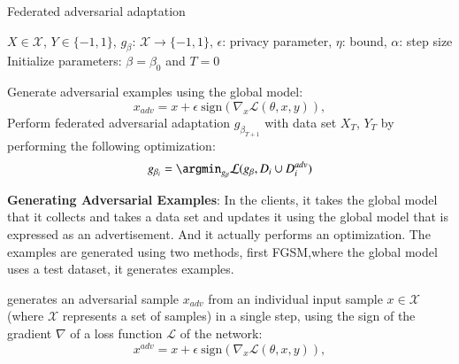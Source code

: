 \begin{algorithm}[h]
\caption{Federated adversarial adaptation}
\label{algo1}
$X \in \mathcal{X}$, $Y \in \{-1, 1\}$, $g_{\beta}$: $\mathcal{X} \to \{-1, 1\}$, $\epsilon$: privacy parameter, $\eta$: bound, $\alpha$: step size
\STATE Initialize parameters: $\beta = \beta_0$ and $T = 0$\\
 
    
    Generate adversarial examples using the global model:
    \begin{equation*}
    x_{adv} = x + \epsilon\ \mbox{sign}(\nabla_x\mathcal{L}(\theta,x,y)),
    \end{equation*}
    Perform federated adversarial adaptation $g_{\beta_{T+1}}$ with data set $X_T$, $Y_T$ by performing the following optimization: 
    \begin{equation*}
            g_{\beta_i} = \argmin_{g_{\beta}} \mathcal{L}(g_{\beta}, D_i \cup D_i^{adv}) 
        \end{equation*}
\end{algorithm}


\textbf{Generating Adversarial Examples}: In the clients, it takes the global model that it collects and takes a data set and updates it using the global model that is expressed as an advertisement. And it actually performs an optimization. The examples are generated using two methods, first FGSM,where the global model uses a test dataset, it generates examples.


 generates an adversarial sample $x_{adv}$ from an individual input sample $x \in \mathcal{X}$ (where $\mathcal{X}$ represents a set of samples) in a single step, using the sign
of the gradient $\nabla$ of a loss function $\mathcal{L}$ of the network\cite{kurakin2018adversarial}:
%
\begin{equation} \label{eq:FGSM}
x^{adv} = x + \epsilon\ \mbox{sign}(\nabla_x\mathcal{L}(\theta,x,y)),
\end{equation}



